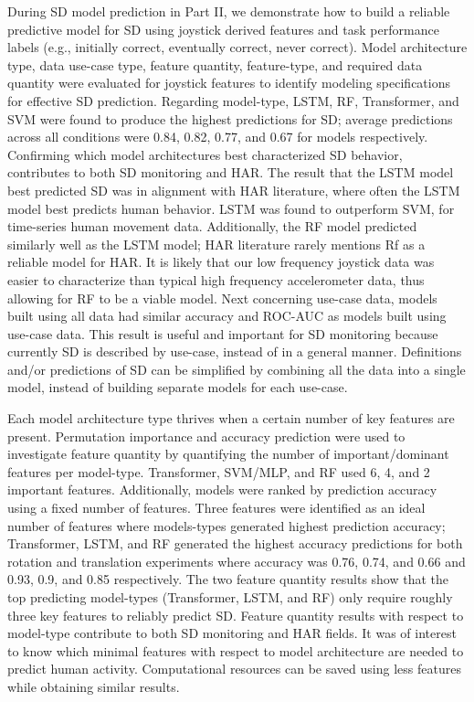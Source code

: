 \documentclass{ieeeaccess}
\begin{document}
During SD model prediction in Part II, we demonstrate how to build a reliable predictive model for SD using joystick derived features and task performance labels (e.g., initially correct, eventually correct, never correct). Model architecture type, data use-case type, feature quantity, feature-type, and required data quantity were evaluated for joystick features to identify modeling specifications for effective SD prediction. Regarding model-type, LSTM, RF, Transformer, and SVM were found to produce the highest predictions for SD; average predictions across all conditions were 0.84, 0.82, 0.77, and 0.67 for models respectively. Confirming which model architectures best characterized SD behavior, contributes to both SD monitoring and HAR. The result that the LSTM model best predicted SD was in alignment with HAR literature, where often the LSTM model best predicts human behavior. LSTM was found to outperform SVM, for time-series human movement data. Additionally, the RF model predicted similarly well as the LSTM model; HAR literature rarely mentions Rf as a reliable model for HAR. It is likely that our low frequency joystick data was easier to characterize than typical high frequency accelerometer data, thus allowing for RF to be a viable model. Next concerning use-case data, models built using all data had similar accuracy and ROC-AUC as models built using use-case data. This result is useful and important for SD monitoring because currently SD is described by use-case, instead of in a general manner. Definitions and/or predictions of SD can be simplified by combining all the data into a single model, instead of building separate models for each use-case. 

Each model architecture type thrives when a certain number of key features are present. Permutation importance and accuracy prediction were used to investigate feature quantity by quantifying the number of important/dominant features per model-type. Transformer, SVM/MLP, and RF used 6, 4, and 2 important features. Additionally, models were ranked by prediction accuracy using a fixed number of features. Three features were identified as an ideal number of features where models-types generated highest prediction accuracy; Transformer, LSTM, and RF generated the highest accuracy predictions for both rotation and translation experiments where accuracy was 0.76, 0.74, and 0.66 and 0.93, 0.9, and 0.85 respectively. The two feature quantity results show that the top predicting model-types (Transformer, LSTM, and RF) only require roughly three key features to reliably predict SD. Feature quantity results with respect to model-type contribute to both SD monitoring and HAR fields. It was of interest to know which minimal features with respect to model architecture are needed to predict human activity. Computational resources can be saved using less features while obtaining similar results.
\end{document}
